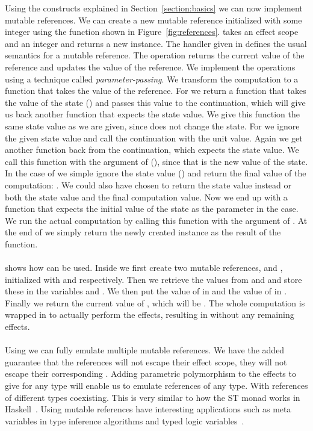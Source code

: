 Using the constructs explained in Section~\ref{section:basics} we can now implement mutable references.
We can create a new mutable reference initialized with some integer using the  function shown in Figure~\ref{fig:references}.
 takes an effect scope and an integer and returns a new  instance.
The handler given in  defines the usual semantics for a mutable reference. 
The  operation returns the current value of the reference and  updates the value of the reference.
We implement the operations using a technique called \emph{parameter-passing}\cite{algtutorial}.
We transform the computation to a function that takes the value of the reference.
 For  we return a function that takes the value of the state () and passes this value to the continuation, which will give us back another function that expects the state value. We give this function the same state value as we are given, since  does not change the state.
 For  we ignore the given state value and call the continuation with the unit value.
 Again we get another function back from the continuation, which expects the state value.
 We call this function with the argument of  (), since that is the new value of the state.
 In the case of  we simple ignore the state value () and return the final value of the computation: .
 We could also have chosen to return the state value instead or both the state value and the final computation value.
 Now we end up with a function that expects the initial value of the state as the parameter  in the  case.
 We run the actual computation by calling this function with the  argument of .
 At the end of  we simply return the newly created instance as the result of the function.
\\\\
 shows how  can be used.
Inside  we first create two mutable references,  and , initialized with  and  respectively.
Then we retrieve the values from  and  and store these in the variables  and .
We then put the value of  in  and the value of  in .
Finally we return the current value of , which will be .
The whole computation is wrapped in  to actually perform the effects, resulting in  without any remaining effects.
\\\\
Using  we can fully emulate multiple mutable references.
We have the added guarantee that the references will not escape their effect scope, they will not escape their corresponding .
Adding parametric polymorphism to the effects to give  for any type  will enable us to emulate references of any type.
With references of different types coexisting.
This is very similar to how the ST monad works in Haskell~\cite{runst}.
Using mutable references have interesting applications such as meta variables in type inference algorithms and typed logic variables~\cite{typedlogic}.

